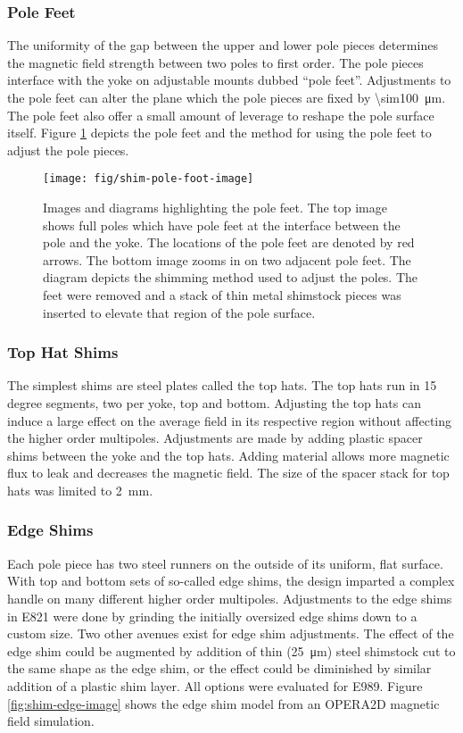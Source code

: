 \subsubsection{Pole Feet}
The uniformity of the gap between the upper and lower pole pieces determines the magnetic field strength between two poles to first order. The pole pieces interface with the yoke on adjustable mounts dubbed ``pole feet''.  Adjustments to the pole feet can alter the plane which the pole pieces are fixed by \SI{\sim100}{\micro \meter}.  The pole feet also offer a small amount of leverage to reshape the pole surface itself.  Figure \ref{fig:shim-pole-foot-image} depicts the pole feet and the method for using the pole feet to adjust the pole pieces.

\begin{figure}
\centering
\texttt{[image: fig/shim-pole-foot-image]}
\caption{
    Images and diagrams highlighting the pole feet.  The top image shows full poles which have pole feet at the interface between the pole and the yoke.  The locations of the pole feet are denoted by red arrows. The bottom image zooms in on two adjacent pole feet.  The diagram depicts the shimming method used to adjust the poles.  The feet were removed and a stack of thin metal shimstock pieces was inserted to elevate that region of the pole surface. 
    \label{fig:shim-pole-foot-image}
}
\end{figure}


\subsubsection{Top Hat Shims}
The simplest shims are steel plates called the top hats.  The top hats run in 15 degree segments, two per yoke, top and bottom.  Adjusting the top hats can induce a large effect on the average field in its respective region without affecting the higher order multipoles.  Adjustments are made by adding plastic spacer shims between the yoke and the top hats.  Adding material allows more magnetic flux to leak and decreases the magnetic field.  The size of the spacer stack for top hats was limited to \SI{2}{\mm}.

\subsubsection{Edge Shims}
Each pole piece has two steel runners on the outside of its uniform, flat surface.  With top and bottom sets of so-called edge shims, the design imparted a complex handle on many different higher order multipoles.  Adjustments to the edge shims in E821 were done by grinding the initially oversized edge shims down to a custom size.  Two other avenues exist for edge shim adjustments. The effect of the edge shim could be augmented by addition of thin (\SI{25}{\micro \meter}) steel shimstock cut to the same shape as the edge shim, or the effect could be diminished by similar addition of a plastic shim layer.  All options were evaluated for E989.  Figure \ref{fig:shim-edge-image} shows the edge shim model from an OPERA2D magnetic field simulation.  

